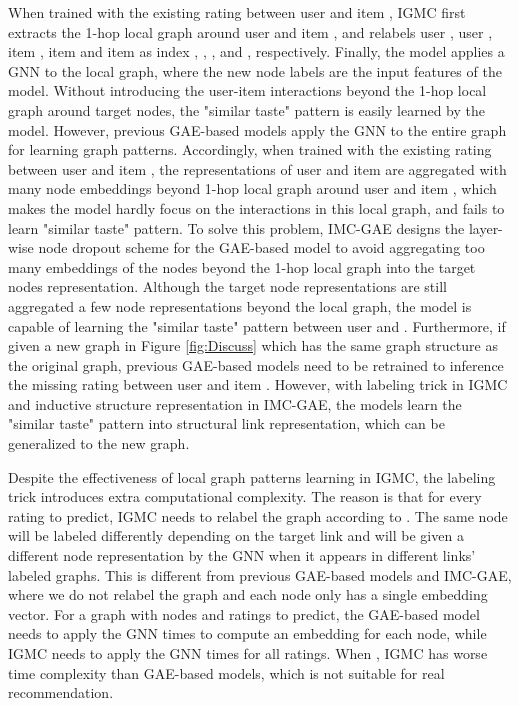 \documentclass[sigconf]{acmart}
\begin{document}
When trained with the existing rating between user  and item , IGMC first extracts the 1-hop local graph around user  and item , and relabels user , user , item , item  and item  as index , , ,  and , respectively. Finally, the model applies a GNN to the local graph, where the new node labels are the input features of the model. Without introducing the user-item interactions beyond the 1-hop local graph around target nodes, the "similar taste" pattern is easily learned by the model. However, previous GAE-based models apply the GNN to the entire graph for learning graph patterns. Accordingly, when trained with the existing rating between user  and item , the representations of user  and item  are aggregated with many node embeddings beyond 1-hop local graph around user  and item , which makes the model hardly focus on the interactions in this local graph, and fails to learn "similar taste" pattern. To solve this problem, IMC-GAE designs the layer-wise node dropout scheme for the GAE-based model to avoid aggregating too many embeddings of the nodes beyond the 1-hop local graph into the target nodes representation. Although the target node representations are still aggregated a few node representations beyond the local graph, the model is capable of learning the "similar taste" pattern between user  and . Furthermore, if given a new graph in Figure \ref{fig:Discuss} which has the same graph structure as the original graph, previous GAE-based models need to be retrained to inference the missing rating between user  and item . However, 
with labeling trick in IGMC and inductive structure representation in IMC-GAE, the models learn the "similar taste" pattern into structural link representation, which can be generalized to the new graph.

Despite the effectiveness of local graph patterns learning in IGMC, the labeling trick introduces extra computational complexity. The reason is that for every rating  to predict, IGMC needs to relabel the graph according to . The same node  will be labeled differently depending on the target link and will be given a different node representation by the GNN when it appears in different links’ labeled graphs. This is different from previous GAE-based models and IMC-GAE, where we do not relabel the graph and each node only has a single embedding vector. For a graph with  nodes and  ratings to predict, the GAE-based model needs to apply the GNN  times to compute an embedding for each node, while IGMC needs to apply the GNN  times for all ratings. When , IGMC has worse time complexity than GAE-based models, which is not suitable for real recommendation. 
\end{document}
